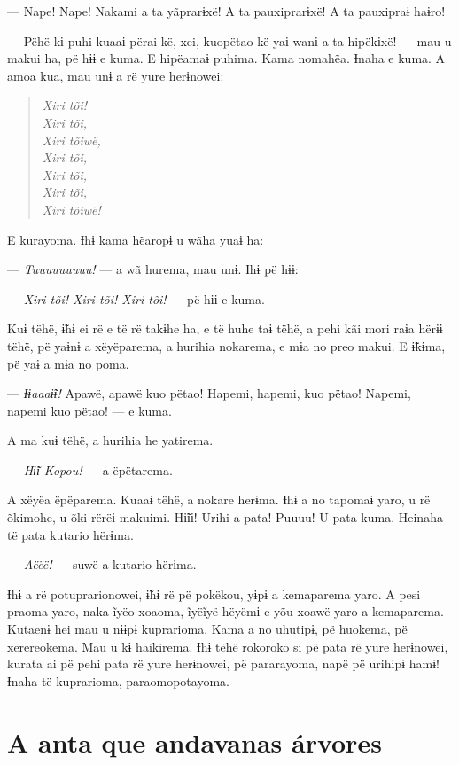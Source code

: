 --- Nape! Nape! Nakami a ta yãprarɨxë! A ta pauxiprarɨxë! A ta pauxipraɨ
haɨro! 

--- Pëhë kɨ puhi kuaaɨ përai kë, xei, kuopëtao kë yaɨ wanɨ a ta hipëkɨxë!
--- mau u makui ha, pë hɨɨ e kuma. E hipëamaɨ puhima. Kama nomahẽa.
Ɨnaha e kuma. A amoa kua, mau unɨ a rë yure herɨnowei: 

\begin{quote}
\textit{Xiri tõi!\\
Xiri tõi,\\
Xiri tõiwë,\\
Xiri tõi,\\
Xiri tõi,\\
Xiri tõi,\\
Xiri tõiwë!}
\end{quote}

E kurayoma. Ɨhɨ kama hẽaropɨ u wãha yuaɨ ha: 

--- \textit{Tuuuuuuuuu!} --- a wã hurema, mau unɨ. Ɨhɨ pë hɨɨ: 

--- \textit{Xiri tõi! Xiri tõi! Xiri tõi!} --- pë hɨɨ e kuma. 

Kuɨ tëhë, ɨ̃hɨ ei rë e të rë takɨhe ha, e të huhe taɨ tëhë, a pehi kãi
mori raɨa hërɨɨ tëhë, pë yaɨnɨ a xëyëparema, a hurihia nokarema, e mɨa
no preo makui. E ɨ̃kɨma, pë yaɨ a mɨa no poma. 

--- \textit{Ɨɨaaaɨ̃ɨ!} Apawë, apawë kuo pëtao! Hapemi, hapemi, kuo pëtao! Napemi,
napemi kuo pëtao! --- e kuma. 

A ma kuɨ tëhë, a hurihia he yatirema. 

--- \textit{Hɨ̃ɨ Kopou!} --- a ëpëtarema. 

A xëyëa ëpëparema. Kuaaɨ tëhë, a nokare herɨma. Ɨhɨ a no tapomaɨ yaro, u
rë õkimohe, u õki rërëɨ makuimi. Hɨ̃ɨɨ! Urihi a pata! Puuuu! U pata kuma.
Heinaha të pata kutario hërɨma.

--- \textit{Aëëë!} --- suwë a kutario hërɨma. 

Ɨhɨ a rë potuprarionowei, ɨ̃hɨ rë pë pokëkou, yɨpɨ a kemaparema yaro. A pesi praoma yaro, naka ĩyëo xoaoma, ĩyëĩyë hëyëmɨ e yõu xoawë yaro a
kemaparema. Kutaenɨ hei mau u nɨɨpɨ kuprarioma. Kama a no uhutipɨ, pë
huokema, pë xerereokema. Mau u kɨ haikirema. Ɨhɨ tëhë rokoroko si pë
pata rë yure herɨnowei, kurata ai pë pehi pata rë yure herɨnowei, pë
pararayoma, napë pë urihipɨ hamɨ! Ɨnaha të kuprarioma, paraomopotayoma.

 \chapter[A anta que andava nas árvores]{A anta que andava\break nas árvores}
 
